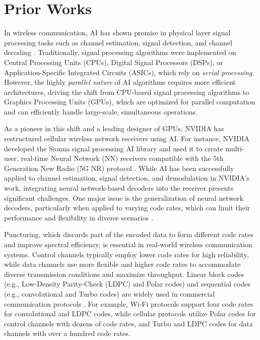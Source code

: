 \section{Prior Works}
In wireless communication, AI has shown promise in physical layer signal processing tasks such as channel estimation, signal detection, and channel decoding \cite{ml_ch_est0, ml_ch_est1, ml_mimo_det0, ml_mimo_det1, ml_ch_dec0, ml_ch_dec1}. Traditionally, signal processing algorithms were implemented on Central Processing Units (CPUs), Digital Signal Processors (DSPs), or Application-Specific Integrated Circuits (ASICs), which rely on \textit{serial processing}. However, the highly \textit{parallel nature} of AI algorithms requires more efficient architectures, driving the shift from CPU-based signal processing algorithms to Graphics Processing Units (GPUs), which are optimized for parallel computation and can efficiently handle large-scale, simultaneous operations.

As a pioneer in this shift and a leading designer of GPUs, NVIDIA has restructured cellular wireless network receivers using AI. For instance, NVIDIA developed the Sionna signal processing AI library \cite{sionna_lib} and used it to create multi-user, real-time Neural Network (NN) receivers compatible with the 5th Generation New Radio (5G NR) protocol \cite{mumimo_5gnr_sionna, std_5gnr_sionna}. While AI has been successfully applied to channel estimation, signal detection, and demodulation in NVIDIA’s work, integrating neural network-based decoders into the receiver presents significant challenges. One major issue is the generalization of neural network decoders, particularly when applied to varying code rates, which can limit their performance and flexibility in diverse scenarios \cite{6g_unify_decoder}.

Puncturing, which discards part of the encoded data to form different code rates and improve spectral efficiency, is essential in real-world wireless communication systems. Control channels typically employ lower code rates for high reliability, while data channels use more flexible and higher code rates to accommodate diverse transmission conditions and maximize throughput. Linear block codes (e.g., Low-Density Parity-Check (LDPC) and Polar codes) and sequential codes (e.g., convolutional and Turbo codes) are widely used in commercial communication protocols \cite{ldpc_code, polar_code, conv_code, turbo_code}. For example, Wi-Fi protocols \cite{ieee_80211_std} support four code rates for convolutional and LDPC codes, while cellular protocols \cite{3gpp_36212_std, 3gpp_38212_std} utilize Polar codes for control channels with dozens of code rates, and Turbo and LDPC codes for data channels with over a hundred code rates.

